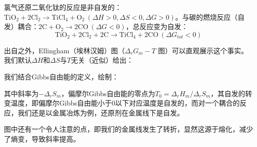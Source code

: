 \begin{example}[反应耦合在冶金提取中的应用]
氯气还原二氧化钛的反应是非自发的：$\text{TiO}_2 + 2\text{Cl}_2 \to \text{TiCl}_4 + \text{O}_2 \ (\Delta H > 0, \Delta S < 0, \Delta G > 0)$。与碳的燃烧反应（自发）耦合：$2\text{C} + \text{O}_2 \to 2\text{CO} \ (\Delta G < 0)$，总反应变为自发：
$$\text{TiO}_2 + 2\text{Cl}_2 + 2\text{C} \to \text{TiCl}_4 + 2\text{CO} \ (\Delta G_{tot} < 0)$$
\end{example}

出自之外，Ellingham（埃林汉姆）图（$\Delta_r G_m-T$ 图）可以直观展示这个事实。我们默认$\Delta H$和$\Delta S$与$T$无关（近似）给出：
\begin{definition}[Ellingham图]
我们结合Gibbs自由能的定义，绘制：
  \begin{center}
\end{center}

其中斜率为$-\Delta_r S_m$，偏摩尔Gibbs自由能的零点为$T_0 = {\Delta_r H_m}/{\Delta_r S_m}$，其自发的转变温度，即偏摩尔Gibbs自由能小于0以下对应温度是自发的，而对一个耦合的反应，我们还是以金属冶炼为例，还原剂在金属线下是自发。

图中还有一个令人注意的点，即我们的金属线发生了转折，显然这源于熔化，减少了熵变，导致斜率提高。
\end{definition}

\newpage
